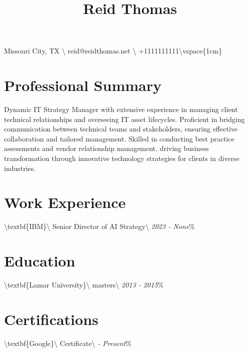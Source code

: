 \documentclass{article}%
\title{Reid Thomas}%
\date{}%
\begin{document}
%
\normalsize%
\maketitle%
Missouri City, TX \textbackslash{} reid@reidthomas.net \textbackslash{} +1111111111\textbackslash{}vspace\{1cm\}%
\section*{Professional Summary}%
\label{sec:ProfessionalSummary}%
Dynamic IT Strategy Manager with extensive experience in managing client technical relationships and overseeing IT asset lifecycles. Proficient in bridging communication between technical teams and stakeholders, ensuring effective collaboration and tailored management. Skilled in conducting best practice assessments and vendor relationship management, driving business transformation through innovative technology strategies for clients in diverse industries.

%
\section*{Work Experience}%
\label{sec:WorkExperience}%
\textbackslash{}textbf\{IBM\}\textbackslash{}%
Senior Director of AI Strategy\textbackslash{}%
\textit{2023 - None}\%
\vspace{0.5em}

%
\section*{Education}%
\label{sec:Education}%
\textbackslash{}textbf\{Lamar University\}\textbackslash{}%
masters\textbackslash{}%
\textit{2013 - 2015}\%
\vspace{0.5em}

%
\section*{Certifications}%
\label{sec:Certifications}%
\textbackslash{}textbf\{Google\}\textbackslash{}%
Certificate\textbackslash{}%
\textit{ - Present}\%
\vspace{0.5em}

%
\end{document}
